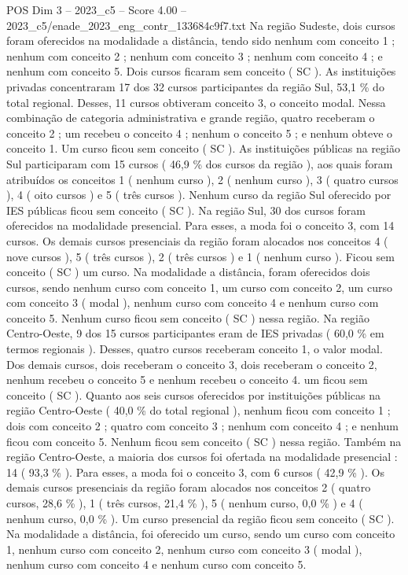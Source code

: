 \begin{textsample}{POS Dim 3 – 2023\_c5 – Score 4.00 – 2023\_c5/enade\_2023\_eng\_contr\_133684c9f7.txt}
Na região Sudeste, dois cursos foram oferecidos na modalidade a distância, tendo sido nenhum com conceito 1 ; nenhum com conceito 2 ; nenhum com conceito 3 ; nenhum com conceito 4 ; e nenhum com conceito 5.
Dois cursos ficaram sem conceito ( SC ).
As instituições privadas concentraram 17 dos 32 cursos participantes da região Sul, 53,1 \% do total regional.
Desses, 11 cursos obtiveram conceito 3, o conceito modal.
Nessa combinação de categoria administrativa e grande região, quatro receberam o conceito 2 ; um recebeu o conceito 4 ; nenhum o conceito 5 ; e nenhum obteve o conceito 1.
Um curso ficou sem conceito ( SC ).
As instituições públicas na região Sul participaram com 15 cursos ( 46,9 \% dos cursos da região ), aos quais foram atribuídos os conceitos 1 ( nenhum curso ), 2 ( nenhum curso ), 3 ( quatro cursos ), 4 ( oito cursos ) e 5 ( três cursos ).
Nenhum curso da região Sul oferecido por IES públicas ficou sem conceito ( SC ).
Na região Sul, 30 dos cursos foram oferecidos na modalidade presencial.
Para esses, a moda foi o conceito 3, com 14 cursos.
Os demais cursos presenciais da região foram alocados nos conceitos 4 ( nove cursos ), 5 ( três cursos ), 2 ( três cursos ) e 1 ( nenhum curso ).
Ficou sem conceito ( SC ) um curso.
Na modalidade a distância, foram oferecidos dois cursos, sendo nenhum curso com conceito 1, um curso com conceito 2, um curso com conceito 3 ( modal ), nenhum curso com conceito 4 e nenhum curso com conceito 5.
Nenhum curso ficou sem conceito ( SC ) nessa região.
Na região Centro-Oeste, 9 dos 15 cursos participantes eram de IES privadas ( 60,0 \% em termos regionais ).
Desses, quatro cursos receberam conceito 1, o valor modal.
Dos demais cursos, dois receberam o conceito 3, dois receberam o conceito 2, nenhum recebeu o conceito 5 e nenhum recebeu o conceito 4. um ficou sem conceito ( SC ).
Quanto aos seis cursos oferecidos por instituições públicas na região Centro-Oeste ( 40,0 \% do total regional ), nenhum ficou com conceito 1 ; dois com conceito 2 ; quatro com conceito 3 ; nenhum com conceito 4 ; e nenhum ficou com conceito 5.
Nenhum ficou sem conceito ( SC ) nessa região.
Também na região Centro-Oeste, a maioria dos cursos foi ofertada na modalidade presencial : 14 ( 93,3 \% ).
Para esses, a moda foi o conceito 3, com 6 cursos ( 42,9 \% ).
Os demais cursos presenciais da região foram alocados nos conceitos 2 ( quatro cursos, 28,6 \% ), 1 ( três cursos, 21,4 \% ), 5 ( nenhum curso, 0,0 \% ) e 4 ( nenhum curso, 0,0 \% ).
Um curso presencial da região ficou sem conceito ( SC ).
Na modalidade a distância, foi oferecido um curso, sendo um curso com conceito 1, nenhum curso com conceito 2, nenhum curso com conceito 3 ( modal ), nenhum curso com conceito 4 e nenhum curso com conceito 5.

\end{textsample}
